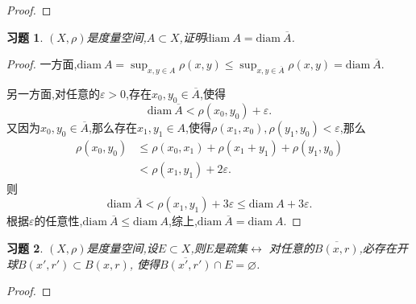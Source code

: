 \documentclass[a4paper,oneside,12pt]{ctexart}
\theoremstyle{plain}
\newtheorem{exercise}{习题}
\theoremstyle{nonumberplain}
\theoremstyle{nonumberplain}
\newtheorem{proof}{证明.}
\renewcommand{\epsilon}{\varepsilon}
\renewcommand{\emptyset}{\varnothing}
\newcommand{\diam}{\mathrm{diam\ }}
\begin{document}
\begin{proof}
    
\end{proof}

\begin{exercise}
    \label{ex:5}
    $(X,\rho)$是度量空间,$A\subset X$,证明$\diam A=\diam \overline{A}$.
\end{exercise}

\begin{proof}
    一方面,$\diam A=\sup_{x,y\in A}\rho(x,y)\leqslant \sup_{x,y\in\overline{A}}\rho(x,y)=\diam \overline{A}$.

    另一方面,对任意的$\epsilon>0$,存在$x_0,y_0\in\overline{A}$,使得
    \begin{equation*}
        \diam \overline{A}<\rho(x_0,y_0)+\epsilon.
    \end{equation*}
    又因为$x_0,y_0\in\overline{A}$,那么存在$x_1,y_1\in A$,使得$\rho(x_1,x_0),\rho(y_1,y_0)<\epsilon$,那么 
    \begin{align*}
        \rho(x_0,y_0)&\leqslant \rho(x_0,x_1)+\rho(x_1+y_1)+\rho(y_1,y_0)\\
        &<\rho(x_1,y_1)+2\epsilon.
    \end{align*}
    则 
    \begin{equation*}
        \diam \overline{A}<\rho(x_1,y_1)+3\epsilon\leqslant \diam A+3\epsilon.
    \end{equation*}
    根据$\epsilon$的任意性,$\diam\overline{A}\leqslant\diam A$,综上,$\diam\overline{A}=\diam A$.
\end{proof}

\begin{exercise}
    \label{ex:6}
    $(X,\rho)$是度量空间,设$E\subset X$,则$E$是疏集$\leftrightarrow$ 对任意的$\overline{B(x,r)}$,必存在开球$B(x',r')\subset B(x,r)$,
    使得$\overline{B(x',r')}\cap E=\emptyset$.
\end{exercise}

\begin{proof}
    
\end{proof}
\end{document}
